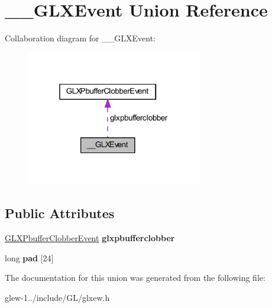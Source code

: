 \hypertarget{union_____g_l_x_event}{\section{\-\_\-\-\_\-\-G\-L\-X\-Event Union Reference}
\label{union_____g_l_x_event}
}


Collaboration diagram for \-\_\-\-\_\-\-G\-L\-X\-Event\-:
\nopagebreak
\begin{figure}[H]
\begin{center}
\leavevmode
\includegraphics[width=217pt]{union_____g_l_x_event__coll__graph}
\end{center}
\end{figure}
\subsection*{Public Attributes}
\begin{DoxyCompactItemize}
\item 
\hypertarget{union_____g_l_x_event_ada5880e2b424bcb2f60a411aaf713fae}{\hyperlink{struct_g_l_x_pbuffer_clobber_event}{G\-L\-X\-Pbuffer\-Clobber\-Event} {\bfseries glxpbufferclobber}}\label{union_____g_l_x_event_ada5880e2b424bcb2f60a411aaf713fae}

\item 
\hypertarget{union_____g_l_x_event_a1cb8f6e7e77a34d25baf43b3f3bc2d4f}{long {\bfseries pad} \mbox{[}24\mbox{]}}\label{union_____g_l_x_event_a1cb8f6e7e77a34d25baf43b3f3bc2d4f}

\end{DoxyCompactItemize}


The documentation for this union was generated from the following file\-:\begin{DoxyCompactItemize}
\item 
glew-\/1../include/\-G\-L/glxew.\-h\end{DoxyCompactItemize}
